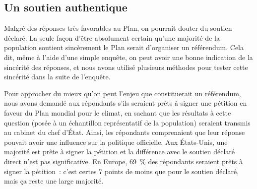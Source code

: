 \documentclass[a5paper,french,openany]{memoir}
\begin{document}
\subsection{Un soutien authentique} %

Malgré des réponses très favorables au Plan, on pourrait douter du soutien déclaré. 
La seule façon d'être absolument certain qu'une majorité de la population soutient sincèrement le Plan serait d'organiser un référendum. Cela dit, même à l'aide d'une simple enquête, on peut avoir une bonne indication de la sincérité des réponses, et nous avons utilisé plusieurs méthodes pour tester cette sincérité dans la suite de l'enquête.

Pour approcher du mieux qu'on peut l'enjeu que constituerait un référendum, nous avons demandé aux répondants s'ils seraient prêts à signer une pétition en faveur du Plan mondial pour le climat, en sachant que les résultats à cette question (posée à un échantillon représentatif de la population) seraient transmis au cabinet du chef d'État. Ainsi, les répondants comprenaient que leur réponse pouvait avoir une influence sur la politique officielle. Aux États-Unis, une majorité est prête à signer la pétition et la différence avec le soutien déclaré direct n'est pas significative. En Europe, 69~\% des répondants seraient prêts à signer la pétition~: c'est certes 7 points de moins que pour le soutien déclaré, mais ça reste une large majorité. 
\end{document}

